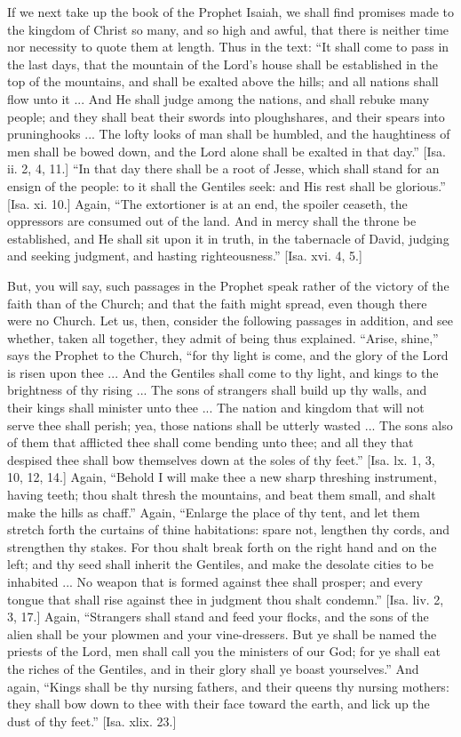 If we next take up the book of the Prophet Isaiah, we shall find
promises made to the kingdom of Christ so many, and so high and awful,
that there is neither time nor necessity to quote them at length. Thus
in the text: ``It shall come to pass in the last days, that the
mountain of the Lord's house shall be established in the top of the
mountains, and shall be exalted above the hills; and all nations shall
flow unto it ... And He shall judge among the nations, and shall
rebuke many people; and they shall beat their swords into
ploughshares, and their spears into pruninghooks ... The lofty looks
of man shall be humbled, and the haughtiness of men shall be bowed
down, and the Lord alone shall be exalted in that day.'' [Isa. ii.
2, 4, 11.] ``In that day there shall be a root of Jesse, which
shall stand for an ensign of the people: to it shall the Gentiles
seek: and His rest shall be glorious.'' [Isa. xi. 10.] Again,
``The extortioner is at an end, the spoiler ceaseth, the
oppressors are consumed out of the land. And in mercy shall the throne
be established, and He shall sit upon it in truth, in the tabernacle
of David, judging and seeking judgment, and hasting
righteousness.'' [Isa. xvi. 4, 5.]

But, you will say, such passages in the Prophet speak rather of the
victory of the faith than of the Church; and that the faith might
spread, even though there were no Church. Let us, then, consider the
following passages in addition, and see whether, taken all together,
they admit of being thus explained. ``Arise, shine,'' says the
Prophet to the Church, ``for thy light is come, and the glory of
the Lord is risen upon thee ... And the Gentiles shall come to thy
light, and kings to the brightness of thy rising ... The sons of
strangers shall build up thy walls, and their kings shall minister
unto thee ... The nation and kingdom that will not serve thee shall
perish; yea, those nations shall be utterly wasted ... The sons also
of them that afflicted thee shall come bending unto thee; and all they
that despised thee shall bow themselves down at the soles of thy
feet.'' [Isa. lx. 1, 3, 10, 12, 14.] Again, ``Behold I will
make thee a new sharp threshing instrument, having teeth; thou shalt
thresh the mountains, and beat them small, and shalt make the hills as
chaff.'' Again, ``Enlarge the place of thy tent, and let them
stretch forth the curtains of thine habitations: spare not, lengthen
thy cords, and strengthen thy stakes. For thou shalt break forth on
the right hand and on the left; and thy seed shall inherit the
Gentiles, and make the desolate cities to be inhabited ... No weapon
that is formed against thee shall prosper; and every tongue that shall
rise against thee in judgment thou shalt condemn.'' [Isa. liv. 2,
3, 17.] Again, ``Strangers shall stand and feed your flocks, and
the sons of the alien shall be your plowmen and your vine-dressers.
But ye shall be named the priests of the Lord, men shall call you the
ministers of our God; for ye shall eat the riches of the Gentiles, and
in their glory shall ye boast yourselves.'' And again, ``Kings
shall be thy nursing fathers, and their queens thy nursing mothers:
they shall bow down to thee with their face toward the earth, and lick
up the dust of thy feet.'' [Isa. xlix. 23.]


